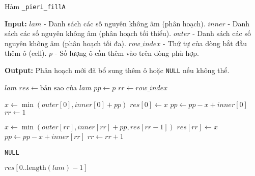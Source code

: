 \documentclass[11pt,a4paper]{book}
\begin{document}
\begin{algorithm}
	\caption{Hàm \texttt{\_pieri\_fillA}}
	\begin{algorithmic}[1] %
	
	\State \textbf{Input:} 
	\State $lam$ - Danh sách các số nguyên không âm (phân hoạch).
	\State $inner$ - Danh sách các số nguyên không âm (phân hoạch tối thiểu).
	\State $outer$ - Danh sách các số nguyên không âm (phân hoạch tối đa).
	\State $row\_index$ - Thứ tự của dòng bắt đầu thêm ô (cell).
	\State $p$ - Số lượng ô cần thêm vào trên dòng phù hợp.
	
	\State \textbf{Output:} Phân hoạch mới đã bổ sung thêm ô hoặc \texttt{NULL} nếu không thể.
	
		\State \Return $lam$ 
	\EndIf
	\State $res \leftarrow \text{bản sao của } lam$ 
	\State $pp \leftarrow p$
	\State $rr \leftarrow row\_index$
	
		\State $x \leftarrow \min(outer[0], inner[0] + pp)$ 
		\State $res[0] \leftarrow x$
		\State $pp \leftarrow pp - x + inner[0]$
		\State $rr \leftarrow 1$
	\EndIf
	
	 
		\State $x \leftarrow \min(outer[rr], inner[rr] + pp, res[rr - 1])$
		\State $res[rr] \leftarrow x$
		\State $pp \leftarrow pp - x + inner[rr]$
		\State $rr \leftarrow rr + 1$
	\EndWhile
	
		\State \Return \texttt{NULL} 
	\EndIf
	
	\State \Return $res[0..\text{length}(lam)-1]$ 
	
	\end{algorithmic}
\end{algorithm}
\end{document}
